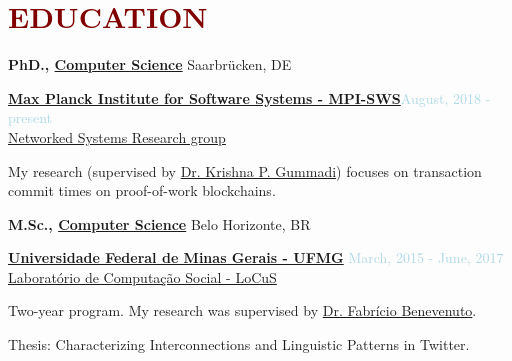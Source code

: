 \section*{\textcolor{maroon}{\normalsize EDUCATION}} 

\textbf{PhD., \href{https://www.mpi-sws.org}{Computer Science}}  \hfill {Saarbrücken, DE}
\begin{outerlist}

\item[] \href{https://www.mpi-sws.org}{\textbf{Max Planck Institute for Software Systems - MPI-SWS}}\hfill {\textcolor{lightblue}{August, 2018 - present}}
 \\ \href{https://www.mpi-sws.org/research-areas/social-and-information-systems/}{Networked Systems Research group}  \medskip

        \begin{innerlist}[-]
                \item My research (supervised by \href{https://people.mpi-sws.org/~gummadi/}{Dr. Krishna P. Gummadi}) focuses on transaction commit times on proof-of-work blockchains.
        \end{innerlist}

\end{outerlist}

\medskip


\textbf{M.Sc., 
        \href{https://ufmg.br/}
             {Computer Science}} \hfill {Belo Horizonte, BR}
\begin{outerlist}

\item[] \href{https://ufmg.br/}{\textbf{Universidade Federal de Minas Gerais - UFMG}}  \hfill {\textcolor{lightblue}{March, 2015 - June, 2017}}
\\ \href{https://www.dcc.ufmg.br/dcc/?q=pt-br/node/2728}{Laboratório de Computação Social - LoCuS}  \medskip 

        \begin{innerlist}[-]
        \item Two-year program. My research was supervised by \href{https://homepages.dcc.ufmg.br/~fabricio/}{Dr. Fabrício Benevenuto}.
        \item Thesis: Characterizing Interconnections and Linguistic Patterns in Twitter.        
        \end{innerlist}

\end{outerlist}

\medskip

